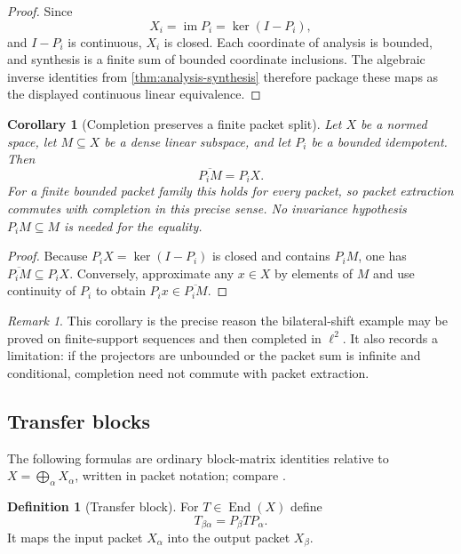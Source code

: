 \documentclass[11pt]{article}
\newtheorem{corollary}[theorem]{Corollary}
\theoremstyle{definition}
\newtheorem{definition}[theorem]{Definition}
\theoremstyle{remark}
\newtheorem{remark}[theorem]{Remark}
\newcommand{\End}{\operatorname{End}}
\newcommand{\im}{\operatorname{im}}
\newcommand{\closure}[1]{\overline{#1}}
\begin{document}
\begin{proof}
Since
\[
X_i=\im P_i=\ker(I-P_i),
\]
and $I-P_i$ is continuous, $X_i$ is closed. Each coordinate of analysis is bounded, and synthesis is a finite sum of bounded coordinate inclusions. The algebraic inverse identities from \cref{thm:analysis-synthesis} therefore package these maps as the displayed continuous linear equivalence.
\end{proof}

\begin{corollary}[Completion preserves a finite packet split]
\label{cor:completion-packet-split}
Let $X$ be a normed space, let $M\subseteq X$ be a dense linear subspace, and let $P_i$ be a bounded idempotent. Then
\[
\boxed{\closure{P_iM}=P_iX.}
\]
For a finite bounded packet family this holds for every packet, so packet extraction commutes with completion in this precise sense. No invariance hypothesis $P_iM\subseteq M$ is needed for the equality.
\end{corollary}

\begin{proof}
Because $P_iX=\ker(I-P_i)$ is closed and contains $P_iM$, one has $\closure{P_iM}\subseteq P_iX$. Conversely, approximate any $x\in X$ by elements of $M$ and use continuity of $P_i$ to obtain $P_ix\in\closure{P_iM}$.
\end{proof}

\begin{remark}
This corollary is the precise reason the bilateral-shift example may be proved on finite-support sequences and then completed in $\ell^2$. It also records a limitation: if the projectors are unbounded or the packet sum is infinite and conditional, completion need not commute with packet extraction.
\end{remark}

\subsection{Transfer blocks}

The following formulas are ordinary block-matrix identities relative to $X=\bigoplus_{\alpha}X_{\alpha}$, written in packet notation; compare \cite{hornJohnson2012}.

\begin{definition}[Transfer block]
For $T\in\End(X)$ define
\[
\boxed{
T_{\beta\alpha}=P_{\beta}TP_{\alpha}.
}
\]
It maps the input packet $X_{\alpha}$ into the output packet $X_{\beta}$.
\end{definition}
\end{document}
